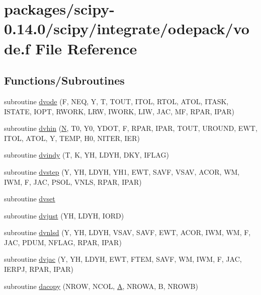 \hypertarget{vode_8f}{}\section{packages/scipy-\/0.14.0/scipy/integrate/odepack/vode.f File Reference}
\label{vode_8f}
\subsection*{Functions/\+Subroutines}
\begin{DoxyCompactItemize}
\item 
subroutine \hyperlink{vode_8f_adae2b81dfd77bd5f895c75eeec5ec14a}{dvode} (F, N\+E\+Q, Y, T, T\+O\+U\+T, I\+T\+O\+L, R\+T\+O\+L, A\+T\+O\+L, I\+T\+A\+S\+K, I\+S\+T\+A\+T\+E, I\+O\+P\+T, R\+W\+O\+R\+K, L\+R\+W, I\+W\+O\+R\+K, L\+I\+W, J\+A\+C, M\+F, R\+P\+A\+R, I\+P\+A\+R)
\item 
subroutine \hyperlink{vode_8f_a4350a4602e85a2ceeb51d8cd88c0944c}{dvhin} (\hyperlink{polmisc_8c_a0240ac851181b84ac374872dc5434ee4}{N}, T0, Y0, Y\+D\+O\+T, F, R\+P\+A\+R, I\+P\+A\+R, T\+O\+U\+T, U\+R\+O\+U\+N\+D, E\+W\+T, I\+T\+O\+L, A\+T\+O\+L, Y, T\+E\+M\+P, H0, N\+I\+T\+E\+R, I\+E\+R)
\item 
subroutine \hyperlink{vode_8f_afb673b5acb863bd0ab4c89a4680314d8}{dvindy} (T, K, Y\+H, L\+D\+Y\+H, D\+K\+Y, I\+F\+L\+A\+G)
\item 
subroutine \hyperlink{vode_8f_a2d8d26599a2bbb024275562a4b410e0c}{dvstep} (Y, Y\+H, L\+D\+Y\+H, Y\+H1, E\+W\+T, S\+A\+V\+F, V\+S\+A\+V, A\+C\+O\+R, W\+M, I\+W\+M, F, J\+A\+C, P\+S\+O\+L, V\+N\+L\+S, R\+P\+A\+R, I\+P\+A\+R)
\item 
subroutine \hyperlink{vode_8f_a3c99fd755d45ecac40a0c6a9cf786609}{dvset}
\item 
subroutine \hyperlink{vode_8f_a553b577168dfbf617f6ee63324e38a80}{dvjust} (Y\+H, L\+D\+Y\+H, I\+O\+R\+D)
\item 
subroutine \hyperlink{vode_8f_ab2d84a77f3810d9b11fe2d59c2e6f55a}{dvnlsd} (Y, Y\+H, L\+D\+Y\+H, V\+S\+A\+V, S\+A\+V\+F, E\+W\+T, A\+C\+O\+R, I\+W\+M, W\+M, F, J\+A\+C, P\+D\+U\+M, N\+F\+L\+A\+G, R\+P\+A\+R, I\+P\+A\+R)
\item 
subroutine \hyperlink{vode_8f_a116d0de626d4de3127eea33065875b46}{dvjac} (Y, Y\+H, L\+D\+Y\+H, E\+W\+T, F\+T\+E\+M, S\+A\+V\+F, W\+M, I\+W\+M, F, J\+A\+C, I\+E\+R\+P\+J, R\+P\+A\+R, I\+P\+A\+R)
\item 
subroutine \hyperlink{vode_8f_afce560da9e29d1c2663c01bd007ee9ae}{dacopy} (N\+R\+O\+W, N\+C\+O\+L, \hyperlink{classA}{A}, N\+R\+O\+W\+A, B, N\+R\+O\+W\+B)

\end{DoxyCompactItemize}
